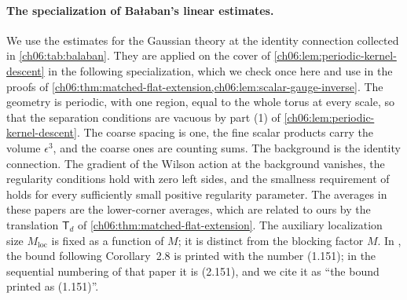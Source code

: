 \paragraph{The specialization of Bałaban's linear estimates.}
We use the estimates for the Gaussian theory at the identity connection collected in \cref{ch06:tab:balaban}. They are applied on the cover of \cref{ch06:lem:periodic-kernel-descent} in the following specialization, which we check once here and use in the proofs of \cref{ch06:thm:matched-flat-extension,ch06:lem:scalar-gauge-inverse}. The geometry is periodic, with one region, equal to the whole torus at every scale, so that the separation conditions are vacuous by part (1) of \cref{ch06:lem:periodic-kernel-descent}. The coarse spacing is one, the fine scalar products carry the volume $\epsilon^3$, and the coarse ones are counting sums. The background is the identity connection. The gradient of the Wilson action at the background vanishes, the regularity conditions \cite[(3.35)--(3.36), p.~396]{Balaban1985Background} hold with zero left sides, and the smallness requirement of \cite[Theorem~3.1]{Balaban1985Background} holds for every sufficiently small positive regularity parameter. The averages in these papers are the lower-corner averages, which are related to ours by the translation $\mathsf T_d$ of \cref{ch06:thm:matched-flat-extension}. The auxiliary localization size $M_{\mathrm{loc}}$ is fixed as a function of $M$; it is distinct from the blocking factor $M$. In \cite[p.~249]{Balaban1984II}, the bound following Corollary~2.8 is printed with the number (1.151); in the sequential numbering of that paper it is (2.151), and we cite it as ``the bound printed as (1.151)''.

